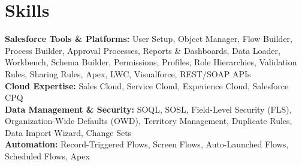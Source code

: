 \documentclass[a4paper,11pt]{article}
\begin{document}
\section*{Skills}
\textbf{Salesforce Tools \& Platforms:} User Setup, Object Manager, Flow Builder, Process Builder, Approval Processes, Reports \& Dashboards, Data Loader, Workbench, Schema Builder, Permissions, Profiles, Role Hierarchies, Validation Rules, Sharing Rules, Apex, LWC, Visualforce, REST/SOAP APIs \\
\textbf{Cloud Expertise:} Sales Cloud, Service Cloud, Experience Cloud, Salesforce CPQ \\
\textbf{Data Management \& Security:} SOQL, SOSL, Field-Level Security (FLS), Organization-Wide Defaults (OWD), Territory Management, Duplicate Rules, Data Import Wizard, Change Sets \\
\textbf{Automation:} Record-Triggered Flows, Screen Flows, Auto-Launched Flows, Scheduled Flows, Apex
\end{document}
